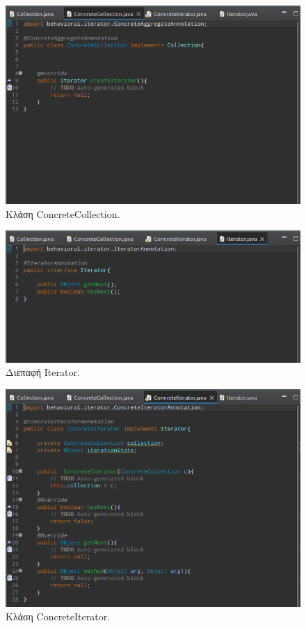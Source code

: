 \begin{figure}[H]
    \centering
    \includegraphics[width=1.0\textwidth]{Figures/concreteCollection.png}
    \caption{Κλάση ConcreteCollection.}
    \label{fig:concreteCollection}
\end{figure}
\begin{figure}[H]
    \centering
    \includegraphics[width=1.0\textwidth]{Figures/iterator.png}
    \caption{Διεπαφή Iterator.}
    \label{fig:iterator}
\end{figure}
\begin{figure}[H]
    \centering
    \includegraphics[width=1.0\textwidth]{Figures/concreteIterator.png}
    \caption{Κλάση ConcreteIterator.}
    \label{fig:concreteIterator}
\end{figure}